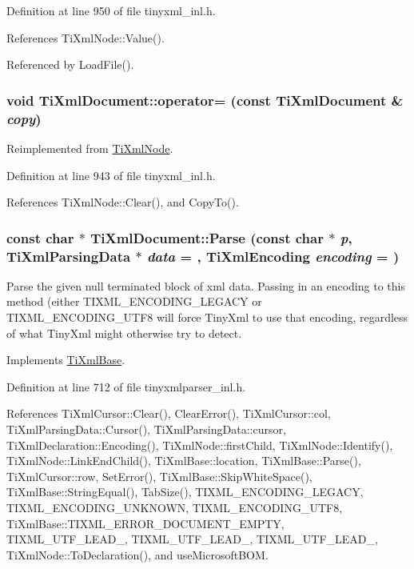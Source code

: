 Definition at line 950 of file tinyxml\_\-inl.h.

References TiXmlNode::Value().

Referenced by LoadFile().\hypertarget{class_ti_xml_document_aafbfacc3414008f619b1345775ef12a4}{
\subsubsection[{operator=}]{\setlength{\rightskip}{0pt plus 5cm}void TiXmlDocument::operator= (const {\bf TiXmlDocument} \& {\em copy})}}
\label{class_ti_xml_document_aafbfacc3414008f619b1345775ef12a4}


Reimplemented from \hyperlink{class_ti_xml_node_a9eb62a8d95b8a98ec2df481cc9e5a7e2}{TiXmlNode}.

Definition at line 943 of file tinyxml\_\-inl.h.

References TiXmlNode::Clear(), and CopyTo().\hypertarget{class_ti_xml_document_a789ad2f06f93d52bdb5570b2f3670289}{
\subsubsection[{Parse}]{\setlength{\rightskip}{0pt plus 5cm}const char $\ast$ TiXmlDocument::Parse (const char $\ast$ {\em p}, \/  {\bf TiXmlParsingData} $\ast$ {\em data} = {}, \/  {\bf TiXmlEncoding} {\em encoding} = {})}}
\label{class_ti_xml_document_a789ad2f06f93d52bdb5570b2f3670289}
Parse the given null terminated block of xml data. Passing in an encoding to this method (either TIXML\_\-ENCODING\_\-LEGACY or TIXML\_\-ENCODING\_\-UTF8 will force TinyXml to use that encoding, regardless of what TinyXml might otherwise try to detect. 

Implements \hyperlink{class_ti_xml_base_a00e4edb0219d00a1379c856e5a1d2025}{TiXmlBase}.

Definition at line 712 of file tinyxmlparser\_\-inl.h.

References TiXmlCursor::Clear(), ClearError(), TiXmlCursor::col, TiXmlParsingData::Cursor(), TiXmlParsingData::cursor, TiXmlDeclaration::Encoding(), TiXmlNode::firstChild, TiXmlNode::Identify(), TiXmlNode::LinkEndChild(), TiXmlBase::location, TiXmlBase::Parse(), TiXmlCursor::row, SetError(), TiXmlBase::SkipWhiteSpace(), TiXmlBase::StringEqual(), TabSize(), TIXML\_\-ENCODING\_\-LEGACY, TIXML\_\-ENCODING\_\-UNKNOWN, TIXML\_\-ENCODING\_\-UTF8, TiXmlBase::TIXML\_\-ERROR\_\-DOCUMENT\_\-EMPTY, TIXML\_\-UTF\_\-LEAD\_, TIXML\_\-UTF\_\-LEAD\_, TIXML\_\-UTF\_\-LEAD\_, TiXmlNode::ToDeclaration(), and useMicrosoftBOM.

